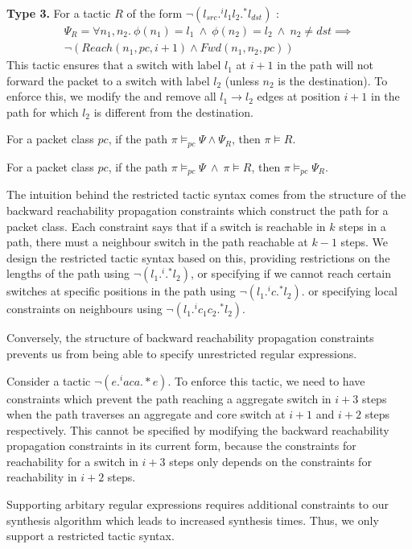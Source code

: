 \noindent\textbf{Type 3.} For a tactic $R$ of the form $\neg (l_{src}  .^i l_1 l_2 .^* l_{dst})$ : 
\begin{multline} \label{eq:t3}
\Psi_R = \forall n_1, n_2.~\phi(n_1) = l_1~\wedge~ \phi(n_2) = l_2 ~\wedge~ n_2 \not=dst  \implies \\ 
\neg (Reach(n_1, pc, i + 1) \wedge Fwd(n_1, n_2, pc))
\end{multline}
This tactic ensures that a switch with label $l_1$ at $i+1$ in the path
will not forward the packet to a switch with label $l_2$ (unless $n_2$ is the destination). 
To enforce this, we modify the  and remove all $l_1\rightarrow l_2$
edges at position $i+1$ in the path for which $l_2$ is different from the destination.  

\begin{theorem}[Soundness]
	For a packet class $pc$, if the path $\pi \models_{pc} \Psi \wedge \Psi_R$, then $\pi \models R$.
\end{theorem}

\begin{theorem}[Completeness]
For a packet class $pc$, if the path $\pi \models_{pc} \Psi ~\wedge~ \pi \models R$, then $\pi \models_{pc} \Psi_R$.
\end{theorem}


The intuition behind the restricted tactic syntax comes from the structure of the backward reachability propagation 
constraints which construct the path for a packet class. Each constraint says that if a switch is reachable in $k$ steps in a path,
 there must a neighbour switch in the path reachable at $k-1$ steps. We design the restricted tactic syntax based
  on this, providing restrictions on the lengths of the path using $\neg (l_1 .^i .^* l_2)$, or specifying if we cannot 
  reach certain switches at specific positions in the path using  $\neg (l_1 .^i c .^* l_2)$. or specifying local 
  constraints on neighbours using $\neg (l_1  .^i c_1 c_2 .^* l_2)$.  
  
  Conversely, the structure of backward reachability propagation constraints 
  prevents us from being able to specify unrestricted regular expressions. 
  \begin{example}
  Consider a tactic $\neg(e .^i a c a .*e)$. To enforce
  this tactic, we need to have constraints which prevent the path reaching a aggregate switch in $i+3$
  steps when the path traverses an aggregate and core switch at $i+1$ and $i+2$ steps
  respectively. This cannot be specified by modifying the backward reachability propagation 
  constraints in its current form, 
  because the constraints for reachability for a switch in $i + 3$ steps only depends on 
  the constraints for reachability in $i+2$ steps. 
   \end{example}
   Supporting arbitary regular expressions
   requires additional constraints to our synthesis algorithm which leads to increased synthesis times. Thus, we only support a restricted tactic syntax.   

